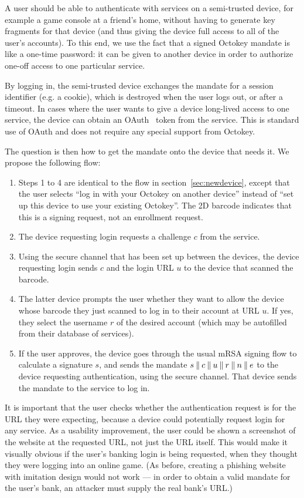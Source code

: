 A user should be able to authenticate with services on a semi-trusted device, for example a game
console at a friend's home, without having to generate key fragments for that device (and thus
giving the device full access to all of the user's accounts). To this end, we use the fact that a
signed Octokey mandate is like a one-time password: it can be given to another device in order to
authorize one-off access to one particular service.

By logging in, the semi-trusted device exchanges the mandate for a session identifier (e.g. a
cookie), which is destroyed when the user logs out, or after a timeout. In cases where the user
wants to give a device long-lived access to one service, the device can obtain an OAuth~\cite{OAuth}
token from the service. This is standard use of OAuth and does not require any special support from
Octokey.

The question is then how to get the mandate onto the device that needs it. We propose the following
flow:

\begin{enumerate}
\item Steps 1 to 4 are identical to the flow in section~\ref{sec:newdevice}, except that the user
selects ``log in with your Octokey on another device'' instead of ``set up this device to use your
existing Octokey''. The 2D barcode indicates that this is a signing request, not an enrollment
request.
\item The device requesting login requests a challenge $c$ from the service.
\item Using the secure channel that has been set up between the devices, the device requesting login
sends $c$ and the login URL $u$ to the device that scanned the barcode.
\item The latter device prompts the user whether they want to allow the device whose barcode they
just scanned to log in to their account at URL $u$. If yes, they select the username $r$ of the
desired account (which may be autofilled from their database of services).
\item If the user approves, the device goes through the usual mRSA signing flow to calculate a
signature $s$, and sends the mandate $s \mathbin{\|} c \mathbin{\|} u \mathbin{\|} r \mathbin{\|} n \mathbin{\|} e$ to the
device requesting authentication, using the secure channel. That device sends the mandate to the
service to log in.
\end{enumerate}

It is important that the user checks whether the authentication request is for the URL they were
expecting, because a device could potentially request login for any service. As a usability
improvement, the user could be shown a screenshot of the website at the requested URL, not just the
URL itself. This would make it visually obvious if the user's banking login is being requested, when
they thought they were logging into an online game. (As before, creating a phishing website with
imitation design would not work --- in order to obtain a valid mandate for the user's bank, an
attacker must supply the real bank's URL.)

